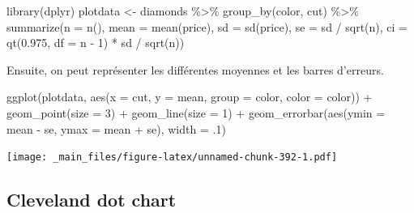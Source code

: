 \documentclass[
]{book}
\newenvironment{Shaded}{\begin{snugshade}}{\end{snugshade}}
\newcommand{\AttributeTok}[1]{\textcolor[rgb]{0.77,0.63,0.00}{#1}}
\newcommand{\DecValTok}[1]{\textcolor[rgb]{0.00,0.00,0.81}{#1}}
\newcommand{\FloatTok}[1]{\textcolor[rgb]{0.00,0.00,0.81}{#1}}
\newcommand{\FunctionTok}[1]{\textcolor[rgb]{0.00,0.00,0.00}{#1}}
\newcommand{\NormalTok}[1]{#1}
\newcommand{\OtherTok}[1]{\textcolor[rgb]{0.56,0.35,0.01}{#1}}
\newcommand{\SpecialCharTok}[1]{\textcolor[rgb]{0.00,0.00,0.00}{#1}}
\theoremstyle{definition}
\theoremstyle{definition}
\theoremstyle{definition}
\theoremstyle{definition}
\theoremstyle{remark}
\begin{document}
\begin{Shaded}
\begin{Highlighting}[]
\FunctionTok{library}\NormalTok{(dplyr)}
\NormalTok{plotdata }\OtherTok{\textless{}{-}}\NormalTok{ diamonds }\SpecialCharTok{\%\textgreater{}\%}
  \FunctionTok{group\_by}\NormalTok{(color, cut) }\SpecialCharTok{\%\textgreater{}\%}
  \FunctionTok{summarize}\NormalTok{(}\AttributeTok{n =} \FunctionTok{n}\NormalTok{(),}
         \AttributeTok{mean =} \FunctionTok{mean}\NormalTok{(price),}
         \AttributeTok{sd =} \FunctionTok{sd}\NormalTok{(price),}
         \AttributeTok{se =}\NormalTok{ sd }\SpecialCharTok{/} \FunctionTok{sqrt}\NormalTok{(n),}
         \AttributeTok{ci =} \FunctionTok{qt}\NormalTok{(}\FloatTok{0.975}\NormalTok{, }\AttributeTok{df =}\NormalTok{ n }\SpecialCharTok{{-}} \DecValTok{1}\NormalTok{) }\SpecialCharTok{*}\NormalTok{ sd }\SpecialCharTok{/} \FunctionTok{sqrt}\NormalTok{(n))}
\end{Highlighting}
\end{Shaded}

Ensuite, on peut représenter les différentes moyennes et les barres d'erreurs.

\begin{Shaded}
\begin{Highlighting}[]
\FunctionTok{ggplot}\NormalTok{(plotdata, }\FunctionTok{aes}\NormalTok{(}\AttributeTok{x =}\NormalTok{ cut,}
                     \AttributeTok{y =}\NormalTok{ mean, }
                     \AttributeTok{group =}\NormalTok{ color, }
                     \AttributeTok{color =}\NormalTok{ color)) }\SpecialCharTok{+}
  \FunctionTok{geom\_point}\NormalTok{(}\AttributeTok{size =} \DecValTok{3}\NormalTok{) }\SpecialCharTok{+}
  \FunctionTok{geom\_line}\NormalTok{(}\AttributeTok{size =} \DecValTok{1}\NormalTok{) }\SpecialCharTok{+}
  \FunctionTok{geom\_errorbar}\NormalTok{(}\FunctionTok{aes}\NormalTok{(}\AttributeTok{ymin =}\NormalTok{ mean }\SpecialCharTok{{-}}\NormalTok{ se, }
                    \AttributeTok{ymax =}\NormalTok{ mean }\SpecialCharTok{+}\NormalTok{ se), }
                \AttributeTok{width =}\NormalTok{ .}\DecValTok{1}\NormalTok{)}
\end{Highlighting}
\end{Shaded}

\texttt{[image: \_main\_files/figure-latex/unnamed-chunk-392-1.pdf]}

\hypertarget{cleveland-dot-chart}{%
\subsection{Cleveland dot chart}\label{cleveland-dot-chart}}
\end{document}
